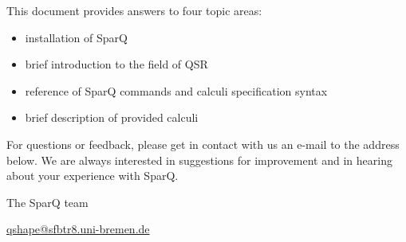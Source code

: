 \documentclass[headsepline]{scrreprt}
\theoremstyle{definition}
\newlength{\rest}
\newcommand{\engine}{SparQ}
\begin{document}
This document provides answers to four topic areas:
\begin{itemize}
	\item installation of SparQ
	\item brief introduction to the field of QSR
	\item reference of SparQ commands and calculi specification syntax
	\item brief description of provided calculi 
\end{itemize}



For questions or feedback, please get in contact with us an e-mail to the address below. We are always interested in suggestions for improvement and in hearing about your experience with \engine{}.

\vspace{0.5cm}
\noindent
The \engine{} team

\noindent
\url{qshape@sfbtr8.uni-bremen.de}


\end{document}
